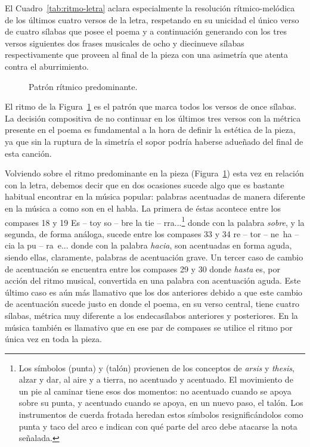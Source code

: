 El Cuadro~\ref{tab:ritmo-letra} aclara especialmente la resolución rítmico-melódica de los últimos cuatro versos de la letra, respetando en su unicidad el único verso de cuatro sílabas que posee el poema y a continuación generando con los tres versos siguientes dos frases musicales de ocho y diecinueve sílabas respectivamente que proveen al final de la pieza con una asimetría que atenta contra el aburrimiento.

\begin{figure}[H]
\centering
{}
\caption{Patrón rítmico predominante.}
\label{fig:patron-ritmico}
\end{figure}

El ritmo de la Figura~\ref{fig:patron-ritmico} es el patrón que marca todos los versos de once sílabas. La decisión compositiva de no continuar en los últimos tres versos con la métrica presente en el poema es fundamental a la hora de definir la estética de la pieza, ya que sin la ruptura de la simetría el sopor podría haberse adueñado del final de esta canción.

Volviendo sobre el ritmo predominante en la pieza (Figura~\ref{fig:patron-ritmico}) esta vez en relación con la letra, debemos decir que en dos ocasiones sucede algo que es bastante habitual encontrar en la música popular: palabras acentuadas de manera diferente en la música a como son en el habla. La primera de éstas acontece entre los compases 18 y 19  {Es -- toy so -- bre la tie -- rra...}\footnote{Los símbolos  (punta) y  (talón) provienen de los conceptos de \emph{arsis} y \emph{thesis}, alzar y dar, al aire y a tierra, no acentuado y acentuado. El movimiento de un pie al caminar tiene esos dos momentos: no acentuado cuando se apoya sobre su punta, y acentuado cuando se apoya, en un nuevo paso, el talón. Los instrumentos de cuerda frotada heredan estos símbolos resignificándolos como punta y taco del arco e indican con qué parte del arco debe atacarse la nota señalada.} donde con la palabra \emph{sobre}, y la segunda, de forma análoga, sucede entre los compases 33 y 34  {re -- tor -- ne~ha -- cia la pu -- ra~e...} donde con la palabra \emph{hacia}, son acentuadas en forma aguda, siendo ellas, claramente, palabras de acentuación grave. Un tercer caso de cambio de acentuación se encuentra entre los compases 29 y 30  donde \emph{hasta} es, por acción del ritmo musical, convertida en una palabra con acentuación aguda. Este último caso es aún más llamativo que los dos anteriores debido a que este cambio de acentuación sucede justo en donde el poema, en su verso central, tiene cuatro sílabas, métrica muy diferente a los endecasílabos anteriores y posteriores. En la música también es llamativo que en ese par de compases se utilice el ritmo  por única vez en toda la pieza.

